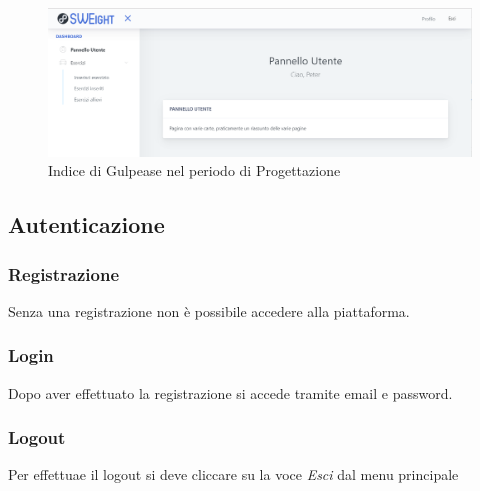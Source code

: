 \begin{figure}[H]
	\includegraphics[width=1\linewidth]{sez/img/istruzioni/dashboard.PNG}
	\caption{Indice di Gulpease nel periodo di Progettazione}
\end{figure}

\subsection{Autenticazione}
\subsubsection{Registrazione}
Senza una registrazione non è possibile accedere alla piattaforma.
\subsubsection{Login}
Dopo aver effettuato la registrazione si accede tramite email e password.
\subsubsection{Logout}
Per effettuae il {logout} si deve cliccare su la voce \textit{Esci} dal menu principale